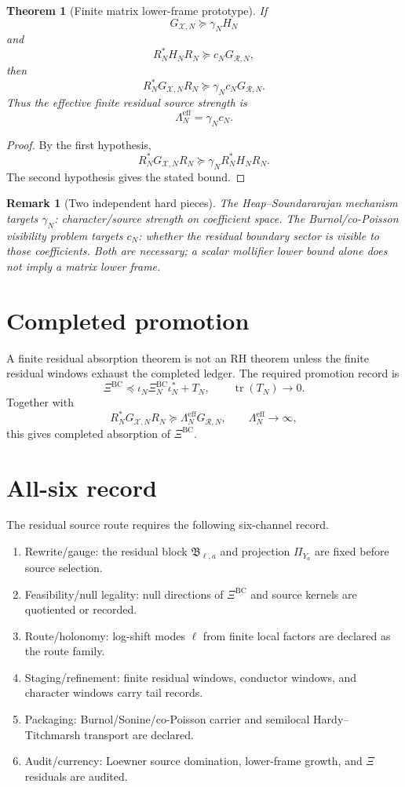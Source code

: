 \documentclass[11pt]{article}
\newtheorem{theorem}{Theorem}
\newtheorem{remark}{Remark}
\newcommand{\XiBC}{\Xi^{\mathrm{BC}}}
\newcommand{\tr}{\operatorname{tr}}
\begin{document}
\begin{theorem}[Finite matrix lower-frame prototype]
If
\[
G_{\mathcal X,N}\succeq \gamma_NH_N
\]
and
\[
R_N^*H_NR_N\succeq c_NG_{\mathcal R,N},
\]
then
\[
\boxed{R_N^*G_{\mathcal X,N}R_N\succeq \gamma_Nc_NG_{\mathcal R,N}.}
\]
Thus the effective finite residual source strength is
\[
\boxed{\Lambda_N^{\mathrm{eff}}=\gamma_Nc_N.}
\]
\end{theorem}

\begin{proof}
By the first hypothesis,
\[
R_N^*G_{\mathcal X,N}R_N\succeq \gamma_NR_N^*H_NR_N.
\]
The second hypothesis gives the stated bound.
\end{proof}

\begin{remark}[Two independent hard pieces]
The Heap--Soundararajan mechanism targets $\gamma_N$: character/source strength on coefficient space.
The Burnol/co-Poisson visibility problem targets $c_N$: whether the residual boundary sector is visible to those coefficients.
Both are necessary; a scalar mollifier lower bound alone does not imply a matrix lower frame.
\end{remark}

\section{Completed promotion}
A finite residual absorption theorem is not an RH theorem unless the finite residual windows exhaust the completed ledger.
The required promotion record is
\[
\XiBC\preceq \iota_N\XiBC_N\iota_N^*+T_N,
\qquad \tr(T_N)\to0.
\]
Together with
\[
R_N^*G_{\mathcal X,N}R_N\succeq \Lambda_N^{\mathrm{eff}}G_{\mathcal R,N},
\qquad \Lambda_N^{\mathrm{eff}}\to\infty,
\]
this gives completed absorption of $\XiBC$.

\section{All-six record}
The residual source route requires the following six-channel record.
\begin{enumerate}[label=P\arabic*]
\item Rewrite/gauge: the residual block $\mathfrak B_{\ell,a}$ and projection $\Pi_{Y_a}$ are fixed before source selection.
\item Feasibility/null legality: null directions of $\XiBC$ and source kernels are quotiented or recorded.
\item Route/holonomy: log-shift modes $\ell$ from finite local factors are declared as the route family.
\item Staging/refinement: finite residual windows, conductor windows, and character windows carry tail records.
\item Packaging: Burnol/Sonine/co-Poisson carrier and semilocal Hardy--Titchmarsh transport are declared.
\item Audit/currency: Loewner source domination, lower-frame growth, and $\Xi$ residuals are audited.
\end{enumerate}
\end{document}
